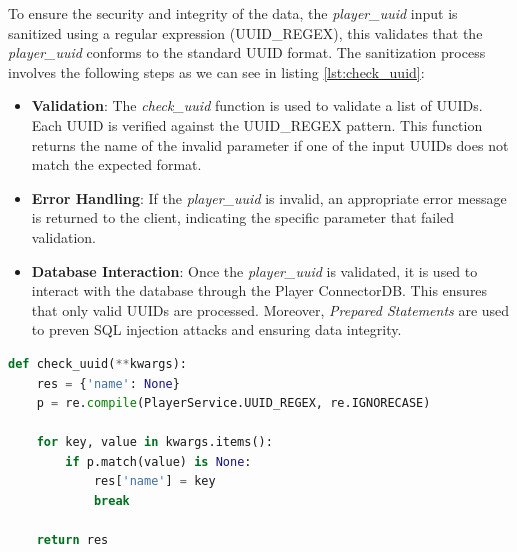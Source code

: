 \documentclass{article}
\begin{document}
To ensure the security and integrity of the data, the \emph{player\_uuid} input is sanitized using a regular expression (UUID\_REGEX), this validates that the \emph{player\_uuid} conforms to the standard UUID format. The sanitization process involves the following steps as we can see in listing \ref{lst:check_uuid}:
\begin{itemize}
    \item \textbf{Validation}: The \emph{check\_uuid} function is used to validate a list of UUIDs. Each UUID is verified against the UUID\_REGEX pattern. This function returns the name of the invalid parameter if one of the input UUIDs does not match the expected format.
    \item \textbf{Error Handling}:  If the \emph{player\_uuid} is invalid, an appropriate error message is returned to the client, indicating the specific parameter that failed validation.
    \item \textbf{Database Interaction}: Once the \emph{player\_uuid} is validated, it is used to interact with the database through the Player ConnectorDB. This ensures that only valid UUIDs are processed. Moreover, \emph{Prepared Statements} are used to preven SQL injection attacks and ensuring data integrity.
\end{itemize}

\begin{lstlisting}[language=Python, caption={Sanitization example}, label={lst:check_uuid}]
def check_uuid(**kwargs):
    res = {'name': None}
    p = re.compile(PlayerService.UUID_REGEX, re.IGNORECASE)

    for key, value in kwargs.items():
        if p.match(value) is None:
            res['name'] = key
            break

    return res
\end{lstlisting}

\newpage
\end{document}
